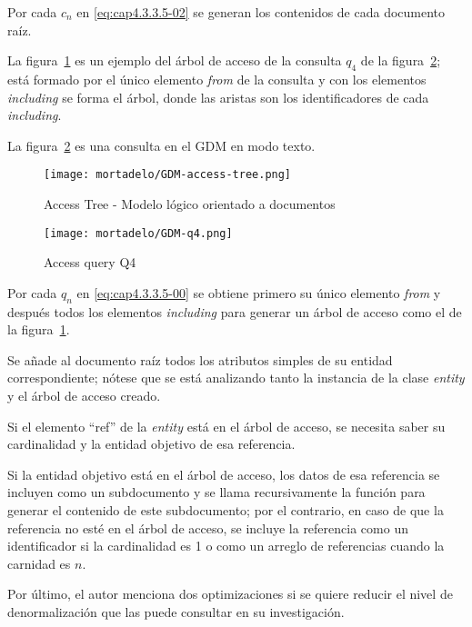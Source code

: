 Por cada $c_{n}$ en \eqref{eq:cap4.3.3.5-02} se generan los contenidos de cada documento raíz.


La figura~\ref{img:mortadelo-gdm-logical-model-access-tree} es un ejemplo del árbol de acceso de la consulta $q_{4}$ de la figura~\ref{img:mortadelo-gdm-logical-model-q4}; está formado por el único elemento \textit{from} de la consulta y con los elementos \textit{including} se forma el árbol, donde las aristas son los identificadores de cada \textit{including}.


La figura~\ref{img:mortadelo-gdm-logical-model-q4} es una consulta en el GDM en modo texto.


\begin{figure}[H] 
    \centering
    \texttt{[image: mortadelo/GDM-access-tree.png]}
    \caption{Access Tree - Modelo lógico orientado a documentos}
    \label{img:mortadelo-gdm-logical-model-access-tree}
\end{figure}


\begin{figure}[H] 
    \centering
    \texttt{[image: mortadelo/GDM-q4.png]}
    \caption{Access query Q4}
    \label{img:mortadelo-gdm-logical-model-q4}
\end{figure}


Por cada $q_{n}$ en \eqref{eq:cap4.3.3.5-00} se obtiene primero su único elemento \textit{from} y después todos los elementos \textit{including} para generar un árbol de acceso como el de la figura~\ref{img:mortadelo-gdm-logical-model-access-tree}.


Se añade al documento raíz todos los atributos simples de su entidad correspondiente; nótese que se está analizando tanto la instancia de la clase \textit{entity} y el árbol de acceso creado.


Si el elemento ``ref'' de la \textit{entity} está en el árbol de acceso, se necesita saber su cardinalidad y la entidad objetivo de esa referencia.


Si la entidad objetivo está en el árbol de acceso, los datos de esa referencia se incluyen como un subdocumento y se llama recursivamente la función para generar el contenido de este subdocumento; por el contrario, en caso de que la referencia no esté en el árbol de acceso, se incluye la referencia como un identificador si la cardinalidad es 1 o como un arreglo de referencias cuando la carnidad es $n$.


Por último, el autor menciona dos optimizaciones si se quiere reducir el nivel de denormalización que las puede consultar en su investigación\cite{de_la_vega_mortadelo_2020}.

